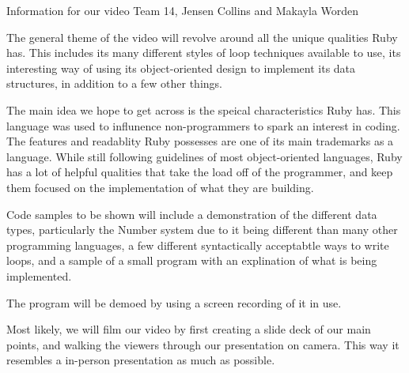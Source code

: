 Information for our video
Team 14, Jensen Collins and Makayla Worden

The general theme of the video will revolve around all the unique qualities Ruby has. This includes its many different styles of loop
techniques available to use, its interesting way of using its object-oriented design to implement its data structures, in addition to a
few other things. 


The main idea we hope to get across is the speical characteristics Ruby has. This language was used to influnence non-programmers to spark
an interest in coding. The features and readablity Ruby possesses are one of its main trademarks as a language. While still following
guidelines of most object-oriented languages, Ruby has a lot of helpful qualities that take the load off of the programmer, and keep them
focused on the implementation of what they are building.


Code samples to be shown will include a demonstration of the different data types, particularly the Number system due to it being
different than many other programming languages, a few different syntactically acceptabtle ways to write loops, and a sample of a small
program with an explination of what is being implemented.


The program will be demoed by using a screen recording of it in use.


Most likely, we will film our video by first creating a slide deck of our main points, and walking the viewers through our presentation on
camera. This way it resembles a in-person presentation as much as possible.
